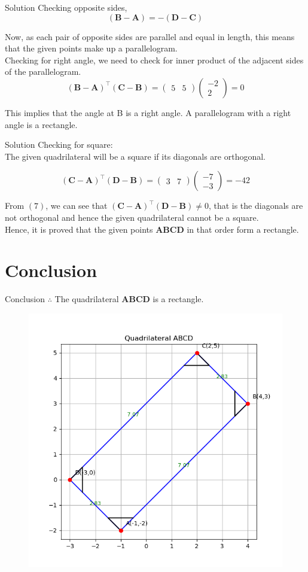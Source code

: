 \documentclass{beamer}
\let\vec\mathbf
\providecommand{\brak}[1]{\ensuremath{\left(#1\right)}}
\theoremstyle{remark}
\newcommand{\myvec}[1]{\ensuremath{\begin{pmatrix}#1\end{pmatrix}}}
\begin{document}
\begin{frame}{Solution}
Checking opposite sides,\\
\begin{equation}
\brak{\vec{B} - \vec{A}} = - \brak{\vec{D} - \vec{C}}
\end{equation}

Now, as each pair of opposite sides are parallel and equal in length, this means that the given points make up a parallelogram.\\

Checking for right angle, we need to check for inner product of the adjacent sides of the parallelogram.\\

\begin{equation}
\brak{\vec{B}-\vec{A}}^{\top}\brak{\vec{C}-\vec{B}} = \myvec{5 & 5}\myvec{-2\\2} = 0
\end{equation}

This implies that the angle at B is a right angle. A parallelogram with a right angle is a rectangle.

\end{frame}

\begin{frame}{Solution}
Checking for square:\\
The given quadrilateral will be a square if its diagonals are orthogonal.

\begin{equation}
    \brak{\vec{C}-\vec{A}}^{\top}\brak{\vec{D}-\vec{B}} = \myvec{3&7}\myvec{-7\\-3} = -42
\end{equation}

From $\brak{7}$, we can see that $\brak{\vec{C}-\vec{A}}^{\top}\brak{\vec{D}-\vec{B}} \neq 0$, that is the diagonals are not orthogonal and hence the given quadrilateral cannot be a square.\\
Hence, it is proved that the given points $\vec{ABCD}$ in that order form a rectangle.

\end{frame}

\section{Conclusion}
\begin{frame}{Conclusion}
$\therefore$ The quadrilateral $\vec{ABCD}$ is a rectangle.

\begin{figure}
    \centering
    \includegraphics[width=0.65\columnwidth]{figs/1.png}
\end{figure}

\end{frame}
\end{document}
